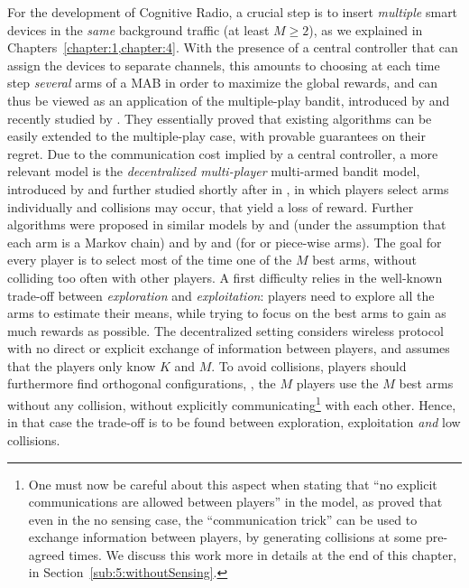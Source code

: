 For the development of Cognitive Radio, a crucial step is to insert \emph{multiple} smart devices in the \emph{same} background traffic (at least $M \geq 2$), as we explained in Chapters~\ref{chapter:1,chapter:4}.
With the presence of a central controller that can assign the devices to separate channels, this amounts to choosing at each time step \emph{several} arms of a MAB in order to maximize the global rewards, and can thus be viewed as an application of the multiple-play bandit, introduced by \cite{Anantharam87a} and recently studied by \cite{Komiyama15}.
They essentially proved that existing algorithms can be easily extended to the multiple-play case, with provable guarantees on their regret.
%
%
Due to the communication cost implied by a central controller, a more relevant model is the
\emph{decentralized multi-player} multi-armed bandit model, introduced by \cite{Zhao10} and further studied shortly after in \cite{Anandkumar10,Anandkumar11}, in which players select arms individually and collisions may occur, that yield a loss of reward.
Further algorithms were proposed in similar models by \cite{Tekin12IEEE} and \cite{Kalathil12} (under the assumption that each arm is a Markov chain)
and by \cite{Avner15,Avner16} and \cite{Rosenski16} (for \iid{} or piece-wise \iid{} arms).
%
The goal for every player is to select most of the time one of the $M$ best arms, without colliding too often with other players.
A first difficulty relies in the well-known trade-off between \emph{exploration} and \emph{exploitation}: players need to explore all the arms to estimate their means, while trying to focus on the best arms to gain as much rewards as possible.
The decentralized setting considers wireless protocol with no direct or explicit exchange of information between players, and assumes that the players only know $K$ and $M$. To avoid collisions, players should furthermore find orthogonal configurations, \ie, the $M$ players use the $M$ best arms without any collision, without explicitly communicating\footnote{One must now be careful about this aspect when stating that ``no explicit communications are allowed between players'' in the model, as \cite{BoursierPerchet18} proved that even in the no sensing case, the ``communication trick'' can be used to exchange information between players, by generating collisions at some pre-agreed times. We discuss this work more in details at the end of this chapter, in Section~\ref{sub:5:withoutSensing}.} with each other.
Hence, in that case the trade-off is to be found between exploration, exploitation \emph{and} low collisions.

